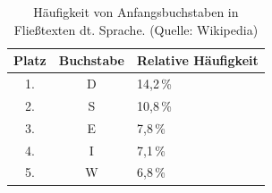 \begin{table}[h!]
    \setlength{\tabcolsep}{0.5em}
    \def\arraystretch{1.5}
    \centering
    \begin{tabular}{|c|c|l|}
        \hline
        \textbf{Platz} & \textbf{Buchstabe} & \textbf{Relative Häufigkeit} \\
        \hline
        1. & D & 14{,}2\,\% \\ \hline
        2. & S & 10{,}8\,\% \\ \hline
        3. & E & 7{,}8\,\% \\ \hline
        4. & I & 7{,}1\,\% \\ \hline
        5. & W & 6{,}8\,\% \\ \hline
    \end{tabular}
    \caption{Häufigkeit von Anfangsbuchstaben in Fließtexten dt. Sprache. (Quelle: Wikipedia)}
    \label{tab:bh_anfang}
\end{table}